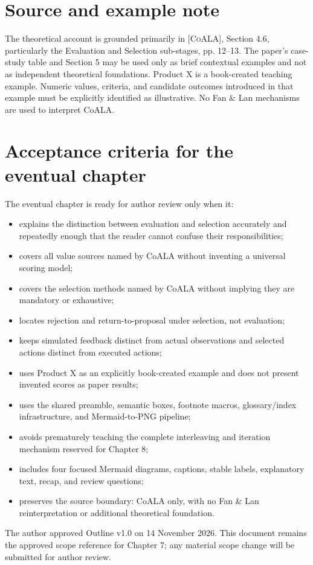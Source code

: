 \section*{Source and example note}
The theoretical account is grounded primarily in \textsc{[CoALA]}, Section 4.6, particularly the Evaluation and Selection sub-stages, pp. 12--13. The paper's case-study table and Section 5 may be used only as brief contextual examples and not as independent theoretical foundations. Product X is a book-created teaching example. Numeric values, criteria, and candidate outcomes introduced in that example must be explicitly identified as illustrative. No Fan \& Lan mechanisms are used to interpret CoALA.

\section*{Acceptance criteria for the eventual chapter}
The eventual chapter is ready for author review only when it:
\begin{itemize}
  \item explains the distinction between evaluation and selection accurately and repeatedly enough that the reader cannot confuse their responsibilities;
  \item covers all value sources named by CoALA without inventing a universal scoring model;
  \item covers the selection methods named by CoALA without implying they are mandatory or exhaustive;
  \item locates rejection and return-to-proposal under selection, not evaluation;
  \item keeps simulated feedback distinct from actual observations and selected actions distinct from executed actions;
  \item uses Product X as an explicitly book-created example and does not present invented scores as paper results;
  \item uses the shared preamble, semantic boxes, footnote macros, glossary/index infrastructure, and Mermaid-to-PNG pipeline;
  \item avoids prematurely teaching the complete interleaving and iteration mechanism reserved for Chapter 8;
  \item includes four focused Mermaid diagrams, captions, stable labels, explanatory text, recap, and review questions;
  \item preserves the source boundary: CoALA only, with no Fan \& Lan reinterpretation or additional theoretical foundation.
\end{itemize}
\begin{takeawaybox}
The author approved Outline v1.0 on 14 November 2026. This document remains the approved scope reference for Chapter 7; any material scope change will be submitted for author review.
\end{takeawaybox}


